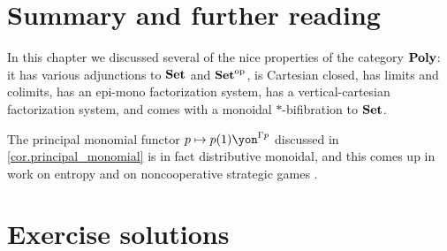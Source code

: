 \documentclass[Book-Poly]{subfiles}
\begin{document}
\section{Summary and further reading}

In this chapter we discussed several of the nice properties of the category $\mathbf{Poly}$: it has various adjunctions to $\mathbf{Set}$ and $\mathbf{Set}^{\textnormal{op}}$, is Cartesian closed, has limits and colimits, has an epi-mono factorization system, has a vertical-cartesian factorization system, and comes with a monoidal $*$-bifibration to $\mathbf{Set}$.

The principal monomial functor $p\mapsto p(1)\yon^{\Gamma p}$ discussed in \cref{cor.principal_monomial} is in fact distributive monoidal, and this comes up in work on entropy \cite{spivak2022polynomial} and on noncooperative strategic games \cite{capucci2022diegetic}.


\section{Exercise solutions}
{\footnotesize
}
\end{document}
